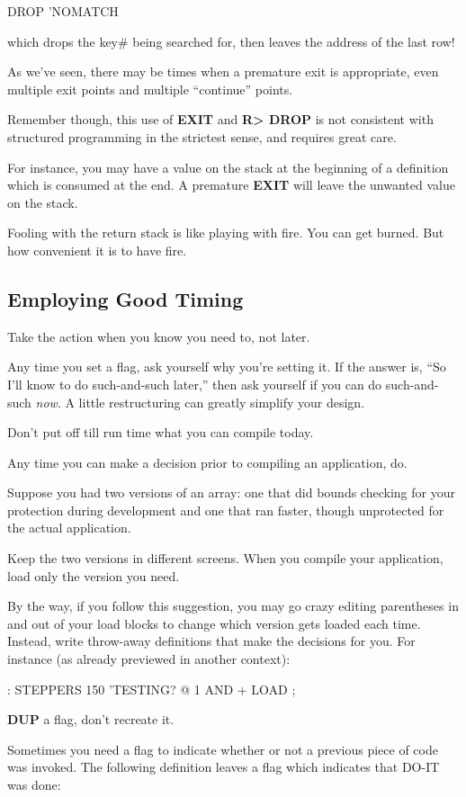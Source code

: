\begin{Code}
DROP  'NOMATCH
\end{Code}
which drops the key\# being searched for, then leaves the address of the
last row!

As we've seen, there may be times when a premature exit is appropriate,
even multiple exit points and multiple ``continue'' points.

Remember though, this use of \textbf{EXIT} and \textbf{R> DROP} is not consistent
with structured programming in the strictest sense, and requires great
care.

For instance, you may have a value on the stack at the beginning of
a definition which is consumed at the end. A premature \textbf{EXIT} will leave
the unwanted value on the stack.

Fooling with the return stack is like playing with fire. You can get
burned. But how convenient it is to have fire.

\subsection{Employing Good Timing}
\begin{tip}
Take the action when you know you need to, not later.
\end{tip}
Any time you set a flag, ask yourself why you're setting it. If the answer
is, ``So I'll know to do such-and-such later,'' then ask yourself if you can
do such-and-such \emph{now}. A little restructuring can greatly simplify your
design.

\begin{tip}
Don't put off till run time what you can compile today.
\end{tip}
Any time you can make a decision prior to compiling an application, do.

Suppose you had two versions of an array: one that did bounds
checking for your protection during development and one that ran faster,
though unprotected for the actual application.

Keep the two versions in different screens. When you compile your
application, load only the version you need.

By the way, if you follow this suggestion, you may go crazy editing
parentheses in and out of your load blocks to change which version gets
loaded each time. Instead, write throw-away definitions that make the
decisions for you. For instance (as already previewed in another context):

\begin{Code}
: STEPPERS   150  'TESTING? @  1 AND +  LOAD ;
\end{Code}
\begin{tip}
\textbf{DUP} a flag, don't recreate it.
\end{tip}
Sometimes you need a flag to indicate whether or not a previous piece of
code was invoked. The following definition leaves a flag which indicates
that DO-IT was done:

